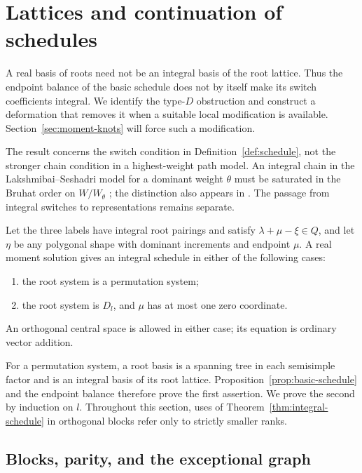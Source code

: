 \section{Lattices and continuation of schedules}
\label{sec:lattice-continuation}

A real basis of roots need not be an integral basis of the root lattice.
Thus the endpoint balance of the basic schedule does not by itself make
its switch coefficients integral.  We identify the type-$D$ obstruction
and construct a deformation that removes it when a suitable local
modification is available.  Section~\ref{sec:moment-knots} will force
such a modification.

The result concerns the switch condition in Definition~\ref{def:schedule},
not the stronger chain condition in a highest-weight path model.  An
integral chain in the Lakshmibai--Seshadri model for a dominant weight
$\theta$ must be saturated in the Bruhat order on $W/W_\theta$
\cite[Section~2.2]{Lit94}; the distinction also appears in
\cite[Theorem~5.6]{KM08}. The passage from integral switches to
representations remains separate.

\begin{theorem}\label{thm:integral-schedule}
Let the three labels have integral root pairings and satisfy
\(\lambda+\mu-\xi\in Q\), and let \(\eta\) be any polygonal shape with
dominant increments and endpoint \(\mu\).  A real moment solution gives an
integral schedule in either of the following cases:
\begin{enumerate}[label=\textup{(\roman*)}]
\item the root system is a permutation system;
\item the root system is \(D_l\), and \(\mu\) has at most one zero
coordinate.
\end{enumerate}
An orthogonal central space is allowed in either case; its equation is
ordinary vector addition.
\end{theorem}

For a permutation system, a root basis is a spanning tree in each
semisimple factor and is an integral basis of its root lattice.
Proposition~\ref{prop:basic-schedule} and the endpoint balance therefore
prove the first assertion.  We prove the second by induction on \(l\).
Throughout this section, uses of Theorem~\ref{thm:integral-schedule} in
orthogonal blocks refer only to strictly smaller ranks.

\subsection{Blocks, parity, and the exceptional graph}


